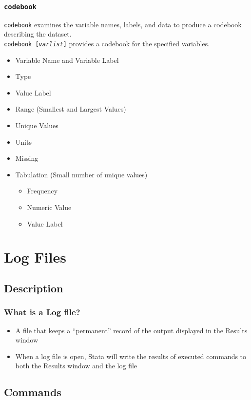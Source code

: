 \documentclass{beamer}
\begin{document}
\begin{frame}
	\frametitle{\texttt{codebook}}
		\texttt{codebook} examines the variable names, labels, and data to produce a codebook describing the dataset. \\
		\texttt{codebook [\textit{varlist}]} provides a codebook for the specified variables.
			\begin{itemize}
				\item Variable Name and Variable Label
				\item Type
				\item Value Label
				\item Range (Smallest and Largest Values)
				\item Unique Values
				\item Units
				\item Missing
				\item Tabulation (Small number of unique values)
					\begin{itemize}
						\item Frequency
						\item Numeric Value
						\item Value Label
					\end{itemize}
			\end{itemize}
\end{frame}

\section{Log Files}
\subsection{Description}

\begin{frame}
	\frametitle{What is a Log file?}
		\begin{itemize}
			\item A file that keeps a ``permanent'' record of the output displayed in the Results window
			\item When a log file is open, Stata will write the results of executed commands to both the Results window and the log file
			
				
		\end{itemize}
\end{frame}

\subsection{Commands}
\end{document}
